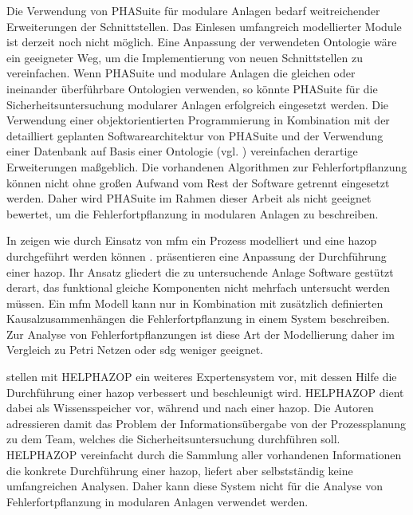 Die Verwendung von PHASuite f\"ur modulare Anlagen bedarf weitreichender Erweiterungen der Schnittstellen. Das Einlesen umfangreich modellierter Module ist derzeit noch nicht m\"oglich. Eine Anpassung der verwendeten Ontologie w\"are ein geeigneter Weg, um die Implementierung von neuen Schnittstellen zu vereinfachen. Wenn PHASuite und modulare Anlagen die gleichen oder ineinander \"uberf\"uhrbare Ontologien verwenden, so k\"onnte PHASuite f\"ur die Sicherheitsuntersuchung modularer Anlagen erfolgreich eingesetzt werden. Die Verwendung einer objektorientierten Programmierung in Kombination mit der detailliert geplanten Softwarearchitektur von PHASuite und der Verwendung einer Datenbank auf Basis einer Ontologie {(vgl. \cite{Zhao_2005a})} vereinfachen derartige Erweiterungen ma\ss{}geblich. Die vorhandenen Algorithmen zur Fehlerfortpflanzung k\"onnen nicht ohne gro\ss{}en Aufwand vom Rest der Software getrennt eingesetzt werden. Daher wird PHASuite im Rahmen dieser Arbeit als nicht geeignet bewertet, um die Fehlerfortpflanzung in modularen Anlagen zu beschreiben.

In  zeigen \citeauthor{Rossing_2010} wie durch Einsatz von \ac{mfm} ein Prozess modelliert und eine \ac{hazop} durchgef\"uhrt werden k\"onnen \cite{Rossing_2010}. \citeauthor{Rossing_2010} pr\"asentieren eine Anpassung der Durchf\"uhrung einer \ac{hazop}. Ihr Ansatz gliedert die zu untersuchende Anlage Software gest\"utzt derart, das funktional gleiche Komponenten nicht mehrfach untersucht werden m\"ussen. Ein \ac{mfm} Modell kann nur in Kombination mit zus\"atzlich definierten Kausalzusammenh\"angen die Fehlerfortpflanzung in einem System beschreiben. Zur Analyse von Fehlerfortpflanzungen ist diese Art der Modellierung daher im Vergleich zu Petri Netzen oder \ac{sdg} weniger geeignet.

\citeauthor{Wang_2012} stellen mit HELPHAZOP ein weiteres Expertensystem vor, mit dessen Hilfe die Durchf\"uhrung einer \ac{hazop} verbessert und beschleunigt wird. HELPHAZOP dient dabei als Wissensspeicher vor, w\"ahrend und nach einer \ac{hazop}. Die Autoren adressieren damit das Problem der Informations\"ubergabe von der Prozessplanung zu dem Team, welches die Sicherheitsuntersuchung durchf\"uhren soll. HELPHAZOP vereinfacht durch die Sammlung aller vorhandenen Informationen die konkrete Durchf\"uhrung einer \ac{hazop}, liefert aber selbstst\"andig keine umfangreichen Analysen. Daher kann diese System nicht f\"ur die Analyse von Fehlerfortpflanzung in modularen Anlagen verwendet werden. 

